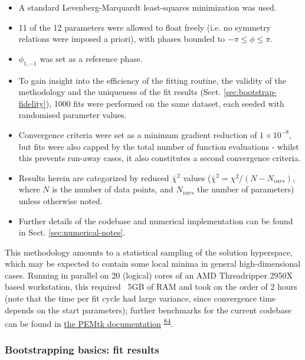 \documentclass[10pt]{article}
\begin{document}
\begin{itemize}
\item A standard Levenberg-Marquardt least-squares minimization was used.
\item 11 of the 12 parameters were allowed to float freely (i.e. no symmetry relations were imposed a priori), with phases bounded to $-\pi\leq\phi\leq\pi$. %
\item $\phi_{1,-1}$ was set as a reference phase. 
\item To gain insight into the efficiency of the fitting routine, the validity of the methodology and the uniqueness of the fit results (Sect. \ref{sec:bootstrap-fidelity}), 1000 fits were performed on the same dataset, each seeded with randomised parameter values. 
\item Convergence criteria were set as a minimum gradient reduction of $1\times10^{-8}$, %
but fits were also capped by the total number of function evaluations - whilst this prevents run-away cases, it also constitutes a second convergence criteria.
\item Results herein are categorized by reduced $\bar{\chi}^2$ values ($\bar{\chi}^2=\chi^2/(N-N_{vars})$, where $N$ is the number of data points, and $N_{vars}$ the number of parameters) unless otherwise noted.
\item Further details of the codebase and numerical implementation can be found in Sect. \ref{sec:numerical-notes}.
\end{itemize}

This methodology amounts to a statistical sampling of the solution hyperspace, which may be expected to contain some local minima in general high-dimensional cases.  Running in parallel on 20 (logical) cores of an AMD Threadripper 2950X based workstation, this required ~5GB of RAM and took on the order of 2 hours (note that the time per fit cycle had large variance, since convergence time depends on the start parameters); further benchmarks for the current codebase can be found in \href{https://pemtk.readthedocs.io/en/latest/index.html}{the PEMtk documentation} \textsuperscript{\hyperref[csl:84]{84}}.


\subsubsection{Bootstrapping basics: fit results}
\end{document}
